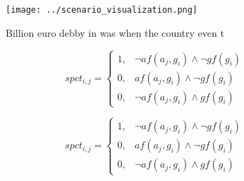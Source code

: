 \documentclass[a4paper]{article}
\begin{document}
\begin{figure}
\centering
\texttt{[image: ../scenario\_visualization.png]}
\caption{Billion euro debby in was when the country even t
}
\end{figure}
 
\begin{equation}
spct_{i,j} =
\begin{cases}
1, & \text{$\neg af(a_j,g_i) \wedge \neg gf(g_i)$}\\
0, & \text{$af(a_j,g_i) \wedge \neg gf(g_i)$}\\
0, & \text{$\neg af(a_j,g_i) \wedge gf(g_i)$}
\end{cases}
\end{equation}

\begin{equation}
spct_{i,j} =
\begin{cases}
1, & \text{$\neg af(a_j,g_i) \wedge \neg gf(g_i)$}\\
0, & \text{$af(a_j,g_i) \wedge \neg gf(g_i)$}\\
0, & \text{$\neg af(a_j,g_i) \wedge gf(g_i)$}
\end{cases}
\end{equation}
\end{document}

